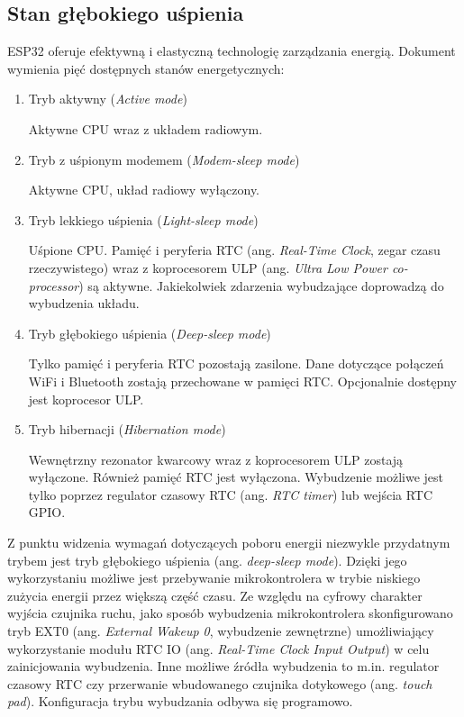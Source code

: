         \subsection{Stan głębokiego uśpienia}

            ESP32 oferuje efektywną i elastyczną technologię zarządzania energią. Dokument \cite{esp32-ds} wymienia pięć dostępnych stanów energetycznych:

            \begin{enumerate}
                \item Tryb aktywny (\textit{Active mode})

                    Aktywne CPU wraz z układem radiowym.

                \item Tryb z uśpionym modemem (\textit{Modem-sleep mode})

                    Aktywne CPU, układ radiowy wyłączony.

                \item Tryb lekkiego uśpienia (\textit{Light-sleep mode})

                    Uśpione CPU. Pamięć i peryferia RTC (ang. \textit{Real-Time Clock}, zegar czasu rzeczywistego) wraz z koprocesorem ULP (ang. \textit{Ultra Low Power co-processor}) są aktywne. Jakiekolwiek zdarzenia wybudzające doprowadzą do wybudzenia układu.

                \item Tryb głębokiego uśpienia (\textit{Deep-sleep mode})

                    Tylko pamięć i peryferia RTC pozostają zasilone. Dane dotyczące połączeń WiFi i Bluetooth zostają przechowane w pamięci RTC. Opcjonalnie dostępny jest koprocesor ULP.

                \item Tryb hibernacji (\textit{Hibernation mode})

                    Wewnętrzny rezonator kwarcowy wraz z koprocesorem ULP zostają wyłączone. Również pamięć RTC jest wyłączona. Wybudzenie możliwe jest tylko poprzez regulator czasowy RTC (ang. \textit{RTC timer}) lub wejścia RTC GPIO.

            \end{enumerate}

            Z punktu widzenia wymagań dotyczących poboru energii niezwykle przydatnym trybem jest tryb głębokiego uśpienia (ang. \textit{deep-sleep mode}). Dzięki jego wykorzystaniu możliwe jest przebywanie mikrokontrolera w trybie niskiego zużycia energii przez większą część czasu. Ze względu na cyfrowy charakter wyjścia czujnika ruchu, jako sposób wybudzenia mikrokontrolera skonfigurowano tryb EXT0 (ang. \textit{External Wakeup 0}, wybudzenie zewnętrzne) umożliwiający wykorzystanie modułu RTC IO (ang. \textit{Real-Time Clock Input Output}) w celu zainicjowania wybudzenia. Inne możliwe źródła wybudzenia to m.in. regulator czasowy RTC czy przerwanie wbudowanego czujnika dotykowego (ang. \textit{touch pad}). Konfiguracja trybu wybudzania odbywa się programowo.

